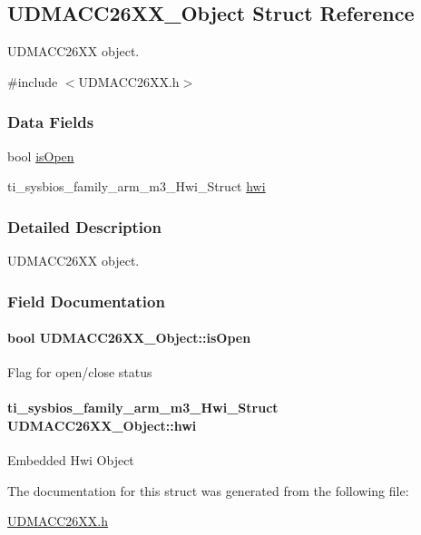 \subsection{U\-D\-M\-A\-C\-C26\-X\-X\-\_\-\-Object Struct Reference}
\label{struct_u_d_m_a_c_c26_x_x___object}


U\-D\-M\-A\-C\-C26\-X\-X object.  




{\ttfamily \#include $<$U\-D\-M\-A\-C\-C26\-X\-X.\-h$>$}

\subsubsection*{Data Fields}
\begin{DoxyCompactItemize}
\item 
bool \hyperlink{struct_u_d_m_a_c_c26_x_x___object_a90be70e4c9fd4907abdb17412c0cc7f4}{is\-Open}
\item 
ti\-\_\-sysbios\-\_\-family\-\_\-arm\-\_\-m3\-\_\-\-Hwi\-\_\-\-Struct \hyperlink{struct_u_d_m_a_c_c26_x_x___object_a6a51eb783573d5e82352cf74f0b0b051}{hwi}
\end{DoxyCompactItemize}


\subsubsection{Detailed Description}
U\-D\-M\-A\-C\-C26\-X\-X object. 

\subsubsection{Field Documentation}
\paragraph[{is\-Open}]{\setlength{\rightskip}{0pt plus 5cm}bool U\-D\-M\-A\-C\-C26\-X\-X\-\_\-\-Object\-::is\-Open}\label{struct_u_d_m_a_c_c26_x_x___object_a90be70e4c9fd4907abdb17412c0cc7f4}
Flag for open/close status 
\paragraph[{hwi}]{\setlength{\rightskip}{0pt plus 5cm}ti\-\_\-sysbios\-\_\-family\-\_\-arm\-\_\-m3\-\_\-\-Hwi\-\_\-\-Struct U\-D\-M\-A\-C\-C26\-X\-X\-\_\-\-Object\-::hwi}\label{struct_u_d_m_a_c_c26_x_x___object_a6a51eb783573d5e82352cf74f0b0b051}
Embedded Hwi Object 

The documentation for this struct was generated from the following file\-:\begin{DoxyCompactItemize}
\item 
\hyperlink{_u_d_m_a_c_c26_x_x_8h}{U\-D\-M\-A\-C\-C26\-X\-X.\-h}\end{DoxyCompactItemize}
